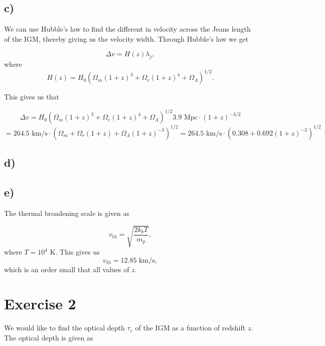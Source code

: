 \documentclass[a4paper,norsk, 10pt]{article}
\begin{document}
\subsection{c)}
We can use Hubble's law to find the different in velocity across the Jeans length of the IGM, thereby giving us the velocity width. Through Hubble's law we get

\begin{equation}
\Delta v = H(z) \lambda_j,
\end{equation}
where
\begin{equation}
H(z) = H_0 (\Omega_m(1+z)^3 + \Omega_r(1+z)^4 + \Omega_{\Lambda})^{1/2}.
\end{equation}

This gives us that

\begin{equation}
\Delta v = H_0 (\Omega_m(1+z)^3 + \Omega_r(1+z)^4 + \Omega_{\Lambda})^{1/2}3.9\text{ Mpc}\cdot(1+z)^{-3/2} 
\end{equation}
\begin{equation}
= 264.5 \text{ km/s}\cdot (\Omega_m + \Omega_r(1+z) + \Omega_{\Lambda}(1+z)^{-3})^{1/2} = 264.5 \text{ km/s}\cdot (0.308 +  0.692(1+z)^{-3})^{1/2}
\end{equation}


\subsection{d)}


\subsection{e)}

The thermal broadening scale is given as

\begin{equation}
 v_{th} = \sqrt{\dfrac{2k_b T}{m_p}},
 \end{equation} 
where $T = 10^4$ K. This gives us
\begin{equation}
v_{th} = 12.85 \text{ km/s},
\end{equation}
which is an order small that all values of $z$.

\section{Exercise 2}

We would like to find the optical depth $\tau_e$ of the IGM as a function of redshift $z$. The optical depth is given as
\end{document}
